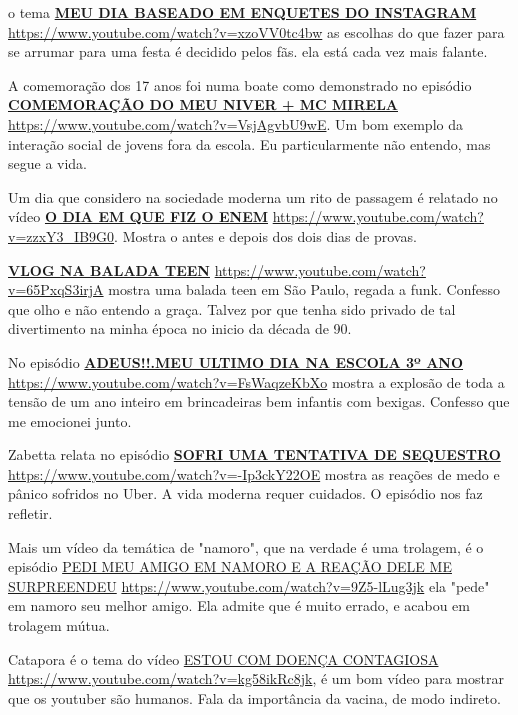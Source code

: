 o tema \href{https://www.youtube.com/watch?v=xzoVV0tc4bw}{\textbf{MEU DIA BASEADO EM ENQUETES DO INSTAGRAM }} \url{https://www.youtube.com/watch?v=xzoVV0tc4bw} as escolhas do que fazer para se arrumar para uma festa é decidido pelos fãs. ela está cada vez mais falante.

A comemoração dos 17 anos foi numa boate como demonstrado no episódio \href{https://www.youtube.com/watch?v=VsjAgvbU9wE}{\textbf{COMEMORAÇÃO DO MEU NIVER + MC MIRELA}} \url{https://www.youtube.com/watch?v=VsjAgvbU9wE}. Um bom exemplo da interação social de jovens fora da escola. Eu particularmente não entendo, mas segue a vida.

Um dia que considero na sociedade moderna um rito de passagem é relatado no vídeo \href{https://www.youtube.com/watch?v=zzxY3_IB9G0}{\textbf{O DIA EM QUE FIZ O ENEM}} \url{https://www.youtube.com/watch?v=zzxY3_IB9G0}. Mostra o antes e depois dos dois dias de provas.

\href{https://www.youtube.com/watch?v=65PxqS3irjA}{\textbf{VLOG NA BALADA TEEN}} \url{https://www.youtube.com/watch?v=65PxqS3irjA} mostra uma balada teen em São Paulo, regada a funk. Confesso que olho e não entendo a graça. Talvez por que tenha sido privado de tal divertimento na minha época no inicio da década de 90.

No episódio \href{https://www.youtube.com/watch?v=FsWaqzeKbXo}{\textbf{ADEUS!!.MEU ULTIMO DIA NA ESCOLA 3º ANO }} \url{https://www.youtube.com/watch?v=FsWaqzeKbXo} mostra a explosão de toda a tensão de um ano inteiro em brincadeiras bem infantis com bexigas. Confesso que me emocionei junto.

Zabetta relata no episódio \href{https://www.youtube.com/watch?v=-Ip3ckY22OE}{\textbf{SOFRI UMA TENTATIVA DE SEQUESTRO}} \url{https://www.youtube.com/watch?v=-Ip3ckY22OE} mostra as reações de medo e pânico sofridos no Uber. A vida moderna requer cuidados. O episódio nos faz refletir.

Mais um vídeo da temática de "namoro", que na verdade é uma trolagem, é o episódio \href{https://www.youtube.com/watch?v=9Z5-lLug3jk}{PEDI MEU AMIGO EM NAMORO E A REAÇÃO DELE ME SURPREENDEU} \url{https://www.youtube.com/watch?v=9Z5-lLug3jk} ela "pede" em namoro seu melhor amigo. Ela admite que é muito errado, e acabou em trolagem mútua.

Catapora é o tema do vídeo \href{https://www.youtube.com/watch?v=kg58ikRc8jk}{ESTOU COM DOENÇA CONTAGIOSA} \url{https://www.youtube.com/watch?v=kg58ikRc8jk}, é um bom vídeo para mostrar que os youtuber são humanos. Fala da importância da vacina, de modo indireto.

